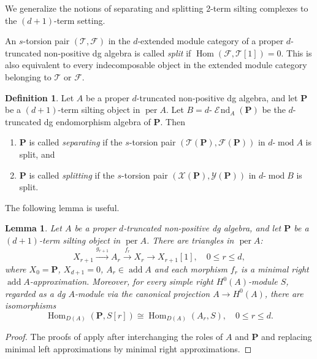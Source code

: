 \documentclass[11pt,a4paper,reqno]{amsart}
\theoremstyle{plain}
\newtheorem{lemma}[theorem]{Lemma}
\numberwithin{equation}{section}
\theoremstyle{definition}
\newtheorem{definition}[theorem]{Definition}
\providecommand{\add}{\operatorname{add}}
\providecommand{\per}{\operatorname{per}}
\renewcommand{\mod}{\operatorname{mod}}
\newcommand{\Hom}{\operatorname{Hom}}
\DeclareMathOperator{\huaEnd}{\mathcal{E}\!nd}
\newcommand{\emod}[2]{#1\text{-}\!\mod #2}
\newcommand{\eend}[2]{#1\text{-}\huaEnd_{#2}}
\newcommand{\PP}{\mathbf{P}}
\newcommand{\T}{\mathcal{T}}
\newcommand{\F}{\mathcal{F}}
\newcommand{\X}{\mathcal{X}}
\newcommand{\Y}{\mathcal{Y}}
\begin{document}
We generalize the notions of separating and splitting 2-term silting complexes to the $(d+1)$-term setting.

An $s$-torsion pair $(\T,\F)$ in the $d$-extended module category of a proper $d$-truncated non-positive dg algebra is called \emph{split} if $\Hom(\F,\T[1])=0$. This is also equivalent to every indecomposable object in the extended module category belonging to $\T$ or $\F$.

\begin{definition}
  Let $A$ be a proper $d$-truncated non-positive dg algebra, and let $\PP$ be a $(d+1)$-term silting object in $\per A$. Let $B=\eend{d}{A}(\PP)$ be the $d$-truncated dg endomorphism algebra of $\PP$. Then
  \begin{enumerate}
    \item $\PP$ is called \emph{separating} if the $s$-torsion pair $(\T(\PP),\F(\PP))$ in $\emod{d}{A}$ is split, and
    \item $\PP$ is called \emph{splitting} if the $s$-torsion pair $(\X(\PP),\Y(\PP))$ in $\emod{d}{B}$ is split.
  \end{enumerate}
\end{definition}

The following lemma is useful.

\begin{lemma}\label{lem:proj-sim}
Let $A$ be a proper $d$-truncated non-positive dg algebra, and let $\PP$ be a $(d+1)$-term silting object in $\per A$. There are triangles in $\per A$:
\begin{equation}\label{eq:approx-tri}
 X_{r+1}\xrightarrow{g_{r+1}}A_r\xrightarrow{f_r}X_r\to X_{r+1}[1],
 \quad0\leq r\leq d,
\end{equation}
where $X_0=\PP$, $X_{d+1}=0$, $A_r\in\add A$ and
each morphism $f_r$ is a minimal right $\add A$-approximation.
Moreover, for every simple right $H^0(A)$-module $S$,
regarded as a dg $A$-module via the canonical projection $A\to H^0(A)$,
there are isomorphisms
\begin{equation}\label{eq:proj-sim}
 \Hom_{D(A)}(\PP,S[r])\cong\Hom_{D(A)}(A_r,S),
 \quad 0\leq r\leq d.
\end{equation}
\end{lemma}

\begin{proof}
The proofs of \cite[Lemmas~8.1, 8.2 and Proposition~8.3]{GZ} apply after interchanging the roles of $A$ and $\PP$ and replacing minimal left approximations by minimal right approximations.
\end{proof}
\end{document}
